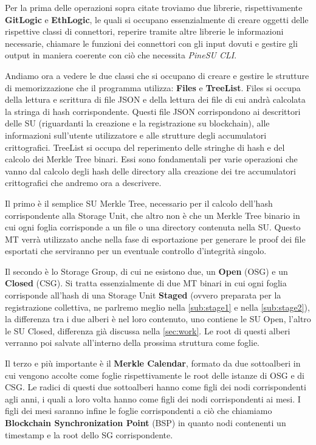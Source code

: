 Per la prima delle operazioni sopra citate troviamo due librerie, rispettivamente \textbf{GitLogic} e
\textbf{EthLogic}, le quali si occupano essenzialmente di creare oggetti delle rispettive classi di connettori,
reperire tramite altre librerie le informazioni necessarie, chiamare le funzioni dei connettori con
gli input dovuti e gestire gli output in maniera coerente con ciò che necessita \emph{PineSU CLI}.

Andiamo ora a vedere le due classi che si occupano di creare e gestire le strutture di memorizzazione
che il programma utilizza: \textbf{Files} e \textbf{TreeList}.
Files si occupa della lettura e scrittura di file JSON e della lettura dei file di cui andrà calcolata
la stringa di hash corrispondente. Questi file JSON corrispondono ai descrittori delle SU
(riguardanti la creazione e la registrazione su blockchain), alle informazioni sull'utente utilizzatore
e alle strutture degli accumulatori crittografici.
TreeList si occupa del reperimento delle stringhe di hash e del calcolo dei Merkle Tree binari.
Essi sono fondamentali per varie operazioni che vanno dal calcolo degli hash delle directory alla
creazione dei tre accumulatori crittografici che andremo ora a descrivere.

Il primo è il semplice SU Merkle Tree, necessario per il calcolo dell'hash corrispondente alla Storage Unit,
che altro non è che un Merkle Tree binario in cui ogni foglia corrisponde a un file o una directory contenuta
nella SU. Questo MT verrà utilizzato anche nella fase di esportazione per generare le proof dei file esportati
che serviranno per un eventuale controllo d'integrità singolo.

Il secondo è lo Storage Group, di cui ne esistono due, un \textbf{Open} (OSG) e un \textbf{Closed} (CSG).
Si tratta essenzialmente di due MT binari in cui ogni foglia corrisponde all'hash di una Storage Unit
\textbf{Staged} (ovvero preparata per la registrazione collettiva, ne parlremo meglio nella
\autoref{sub:stage1} e nella \autoref{sub:stage2}), la differenza tra i due alberi è nel loro contenuto,
uno contiene le SU Open, l'altro le SU Closed, differenza già discussa nella \autoref{sec:work}.
Le root di questi alberi verranno poi salvate all'interno della prossima struttura come foglie.

Il terzo e più importante è il \textbf{Merkle Calendar}, formato da due sottoalberi in cui vengono
accolte come foglie rispettivamente le root delle istanze di OSG e di CSG. Le radici di questi
due sottoalberi hanno come figli dei nodi corrispondenti agli anni, i quali a loro volta hanno
come figli dei nodi corrispondenti ai mesi.
I figli dei mesi saranno infine le foglie corrispondenti a ciò che chiamiamo
\textbf{Blockchain Synchronization Point} (BSP) in quanto nodi contenenti un timestamp e la root
dello SG corrispondente.

